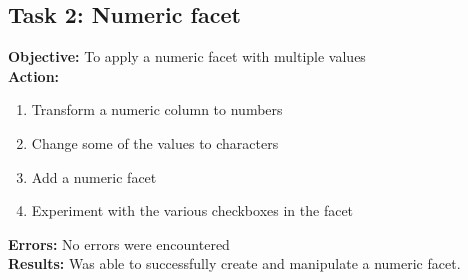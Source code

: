 \documentclass{article}
\begin{document}
\subsection{Task 2: Numeric facet}
\textbf{Objective:} To apply a numeric facet with multiple values\\
\textbf{Action:}
\begin{enumerate}
    \item Transform a numeric column to numbers
    \item Change some of the values to characters
    \item Add a numeric facet
    \item Experiment with the various checkboxes in the facet
\end{enumerate}
\textbf{Errors: }No errors were encountered\\
\textbf{Results:} Was able to successfully create and manipulate a numeric facet.
\end{document}
